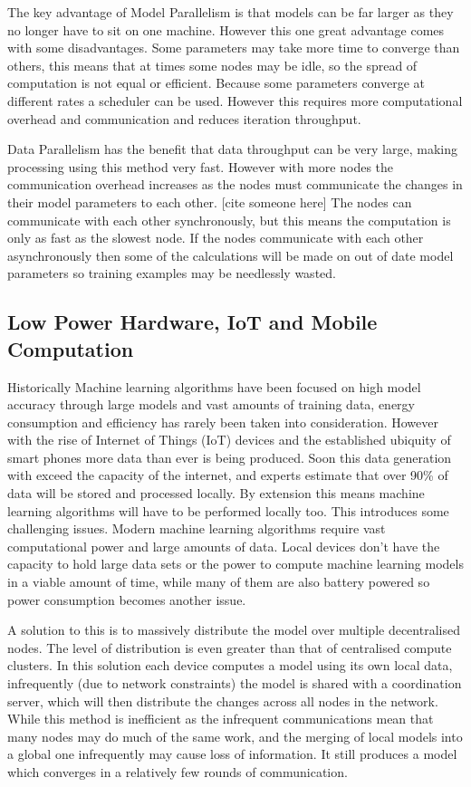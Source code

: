 The key advantage of Model Parallelism is that models can be far larger as they
no longer have to sit on one machine. However this one great advantage comes
with some disadvantages. Some parameters may take more time to converge than
others, this means that at times some nodes may be idle, so the spread of
computation is not equal or efficient. \cite{Dean2012Distbelief} Because some
parameters converge at different rates a scheduler can be used. However this
requires more computational overhead and communication and reduces iteration
throughput. \cite{kim2016STRADS}

Data Parallelism has the benefit that data throughput can be very large, making
processing using this method very fast. However with more nodes the
communication overhead increases as the nodes must communicate the changes in
their model parameters to each other. [cite someone here] The nodes can
communicate with each other synchronously, but this means the computation is
only as fast as the slowest node. If the nodes communicate with each other
asynchronously then some of the calculations will be made on out of date model
parameters so training examples may be needlessly wasted.

\subsection{Low Power Hardware, IoT and Mobile Computation}

Historically Machine learning algorithms have been focused on high model
accuracy through large models and vast amounts of training data, energy
consumption and efficiency has rarely been taken into consideration. However
with the rise of Internet of Things (IoT) devices and the established ubiquity
of smart phones more data than ever is being produced. Soon this data generation
with exceed the capacity of the internet, and experts estimate that over 90\% of
data will be stored and processed locally. \cite{Chaing2016FogIoT} By extension
this means machine learning algorithms will have to be performed locally too.
This introduces some challenging issues. Modern machine learning algorithms
require vast computational power and large amounts of data. Local devices don't
have the capacity to hold large data sets or the power to compute machine
learning models in a viable amount of time, while many of them are also battery
powered so power consumption becomes another issue.

A solution to this is to massively distribute the model over multiple
decentralised nodes. The level of distribution is even greater than that of
centralised compute clusters. In this solution each device computes a model
using its own local data, infrequently (due to network constraints) the model is
shared with a coordination server, which will then distribute the changes across
all nodes in the network. \cite{wang2018EdgeLearning} While this method is
inefficient as the infrequent communications mean that many nodes may do much of
the same work, and the merging of local models into a global one infrequently
may cause loss of information. It still produces a model which converges in a
relatively few rounds of communication. \cite{konevcny2016federated}

